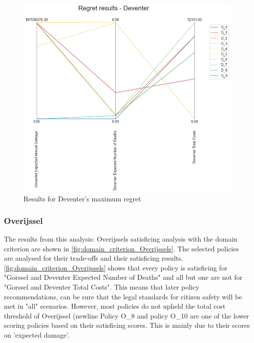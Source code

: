 \begin{figure}[H]
\begin{minipage}[b]{0.4\textwidth}
    \includegraphics[width=1.2\textwidth]{report/figures/results/regret_figure_Deventer.png}
    \caption{Results for Deventer's maximum regret}
    \label{fig:regret_Deventers}
  \end{minipage}
\end{figure}

\subsubsection{Overijssel}
The results from this analysis: Overijssels satisficing analysis with the domain criterion are shown in \autoref{fig:domain_criterion_Overijssels}. The selected policies are analysed for their trade-offs and their satisficing results. \newline
\autoref{fig:domain_criterion_Overijssels} shows that every policy is satisficing for "Gorssel and Deventer Expected Number of Deaths" and all but one are not for "Gorssel and Deventer Total Costs". This means that later policy recommendations, can be sure that the legal standards for citizen safety will be met in "all" scenarios. However, most policies do not upheld the total cost threshold of Overijssel (newline 
\noindent Policy O\_8 and policy O\_10 are one of the lower scoring policies based on their satisficing scores. This is mainly due to their scores on 'expected damage'. 


